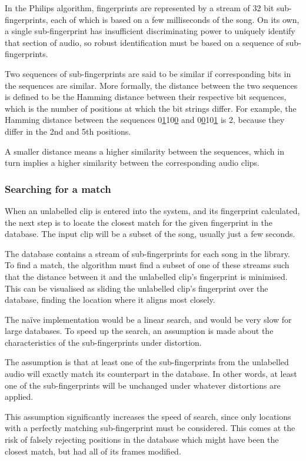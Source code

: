 \documentclass[12pt,a4paper,twoside,openright]{report}
\begin{document}
In the Philips algorithm, fingerprints are represented by a stream of 32 bit sub-fingerprints, each of which is based on a few milliseconds of the song. On its own, a single sub-fingerprint has insufficient discriminating power to uniquely identify that section of audio, so robust identification must be based on a sequence of sub-fingerprints.

Two sequences of sub-fingerprints are said to be similar if corresponding bits in the sequences are similar. More formally, the distance between the two sequences is defined to be the Hamming distance between their respective bit sequences, which is the number of positions at which the bit strings differ. For example, the Hamming distance between the sequences 0\underline{1}10\underline{0} and 0\underline{0}10\underline{1} is 2, because they differ in the 2nd and 5th positions. 

A smaller distance means a higher similarity between the sequences, which in turn implies a higher similarity between the corresponding audio clips.


\subsubsection{Searching for a match}

When an unlabelled clip is entered into the system, and its fingerprint calculated, the next step is to locate the closest match for the given fingerprint in the database. The input clip will be a subset of the song, usually just a few seconds.

The database contains a stream of sub-fingerprints for each song in the library. To find a match, the algorithm must find a subset of one of these streams such that the distance between it and the unlabelled clip's fingerprint is minimised. This can be visualised as sliding the unlabelled clip's fingerprint over the database, finding the location where it aligns most closely.

The na\"ive implementation would be a linear search, and would be very slow for large databases. To speed up the search, an assumption is made about the characteristics of the sub-fingerprints under distortion. 

The assumption is that at least one of the sub-fingerprints from the unlabelled audio will exactly match its counterpart in the database. In other words, at least one of the sub-fingerprints will be unchanged under whatever distortions are applied.

This assumption significantly increases the speed of search, since only locations with a perfectly matching sub-fingerprint must be considered. This comes at the risk of falsely rejecting positions in the database which might have been the closest match, but had all of its frames modified.
\end{document}
